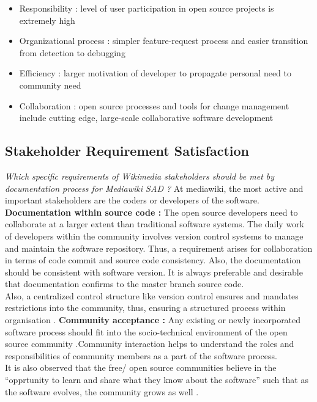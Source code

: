 \begin{itemize}
\item Responsibility : level of user participation in open source projects is extremely high
\item Organizational process : simpler feature-request process and easier transition from detection to debugging 
\item Efficiency : larger motivation of developer to propagate personal need to community need
\item Collaboration : open source processes and tools for change management include cutting edge, large-scale collaborative software development
\end{itemize}

\subsection{Stakeholder Requirement Satisfaction}
\indent \emph {Which specific requirements of Wikimedia stakeholders should be met by documentation process for Mediawiki SAD ?}
At mediawiki, the most active and important stakeholders are the coders or developers of the software.
\newline
\\\indent \textbf{Documentation within source code : }  The open source developers need to collaborate at a larger extent than traditional software systems. The daily work of developers within the community involves version control systems to manage and maintain the software repository. Thus, a requirement arises for collaboration in terms of code commit and source code consistency. Also, the documentation should be consistent with software version. It is always preferable  and desirable that documentation confirms to the master branch source code.
\\\indent Also, a centralized control structure like version control ensures and mandates restrictions into the community, thus, ensuring a structured process within organisation \cite{Wu2001}.
\newline
\indent \textbf{Community acceptance : }Any existing or newly incorporated software process should fit into the socio-technical environment of the open source community \cite{Mens2011}.Community interaction helps to understand the roles and responsibilities of community members as a part of the software process. 
\\\indent It is also observed that the free/ open source communities believe in the \enquote{opprtunity to learn and share what they know about the software} such that as the software evolves, the community grows as well \cite{Scacchi2006}.
